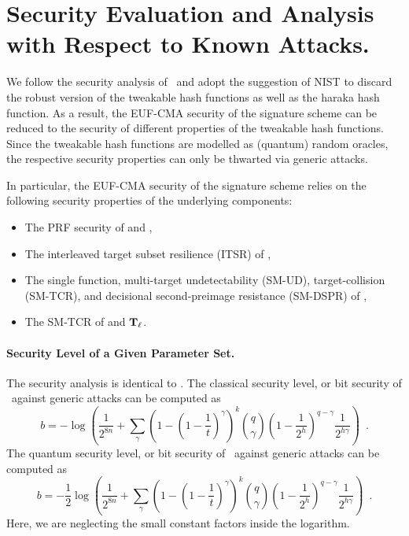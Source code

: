 \section{Security Evaluation and Analysis with Respect to Known Attacks.}

We follow the security analysis of \SPHINCSP\ and adopt the suggestion of NIST \cite{nistdecision} to discard the robust version of the tweakable hash functions as well as the \textsf{haraka} hash function. As a result, the EUF-CMA security of the signature scheme can be reduced to the security of different properties of the tweakable hash functions. Since the tweakable hash functions are modelled as (quantum) random oracles, the respective security properties can only be thwarted via generic attacks.

In particular, the EUF-CMA security of the signature scheme relies on the following security properties of the underlying components:

\begin{itemize}
    \item The PRF security of \PRF and \PRFmsg,

    \item The interleaved target subset resilience (ITSR) of \hashmsg,

    \item The single function, multi-target undetectability (SM-UD), target-collision (SM-TCR), and decisional second-preimage resistance (SM-DSPR) of \hashF,

    \item The SM-TCR of \hashH and $\mathbf{T}_\ell$.
\end{itemize}


\paragraph{Security Level of a Given Parameter Set.}

The security analysis is identical to \SPHINCSP. The classical security level, or bit security of \SPHINCSA\ against generic attacks can be computed as
$$
b=-\log\left(
    \frac{1}{2^{8n}}+
    \sum_{\gamma}
        \left(1-\left(1-\frac{1}{t}\right)^{\gamma}\right)^{k}
        \binom{q}{\gamma}
        \left(1-\frac{1}{2^{h}}\right)^{q-\gamma}
        \frac{1}{2^{h\gamma}}
    \right) \enspace.
$$
The quantum security level, or bit security of \SPHINCSA\ against generic attacks can be computed as
$$
b=-\frac{1}{2}\log\left(
    \frac{1}{2^{8n}}+
    \sum_{\gamma}
        \left(1-\left(1-\frac{1}{t}\right)^{\gamma}\right)^{k}
        \binom{q}{\gamma}
        \left(1-\frac{1}{2^{h}}\right)^{q-\gamma}
        \frac{1}{2^{h\gamma}}
    \right) \enspace.
$$
Here, we are neglecting the small constant factors inside the logarithm. 

